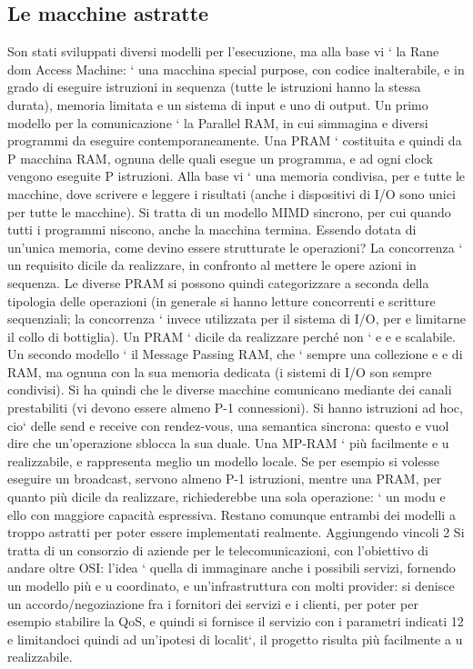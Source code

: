 \documentclass[a4paper,12pt]{article}
\begin{document}
\subsection{Le macchine astratte}
Son stati sviluppati diversi modelli per l'esecuzione, ma alla base vi ` la Rane
dom Access Machine: ` una macchina special purpose, con codice inalterabile,
e
in grado di eseguire istruzioni in sequenza (tutte le istruzioni hanno la stessa
durata), memoria limitata e un sistema di input e uno di output.
Un primo modello per la comunicazione ` la Parallel RAM, in cui simmagina
e
diversi programmi da eseguire contemporaneamente. Una PRAM ` costituita
e
quindi da P macchina RAM, ognuna delle quali esegue un programma, e ad ogni
clock vengono eseguite P istruzioni. Alla base vi ` una memoria condivisa, per
e
tutte le macchine, dove scrivere e leggere i risultati (anche i dispositivi di I/O
sono unici per tutte le macchine). Si tratta di un modello MIMD sincrono, per
cui quando tutti i programmi niscono, anche la macchina termina. Essendo
dotata di un'unica memoria, come devino essere strutturate le operazioni? La
concorrenza ` un requisito dicile da realizzare, in confronto al mettere le opere
azioni in sequenza. Le diverse PRAM si possono quindi categorizzare a seconda
della tipologia delle operazioni (in generale si hanno letture concorrenti e scritture sequenziali; la concorrenza `
invece utilizzata per il sistema di I/O, per
e
limitarne il collo di bottiglia). Un PRAM ` dicile da realizzare perché non `
e
e
e
scalabile.
Un secondo modello ` il Message Passing RAM, che ` sempre una collezione
e
e
di RAM, ma ognuna con la sua memoria dedicata (i sistemi di I/O son sempre
condivisi). Si ha quindi che le diverse macchine comunicano mediante dei canali
prestabiliti (vi devono essere almeno P-1 connessioni). Si hanno istruzioni ad
hoc, cio` delle send e receive con rendez-vous, una semantica sincrona: questo
e
vuol dire che un'operazione sblocca la sua duale. Una MP-RAM ` più facilmente
e u
realizzabile, e rappresenta meglio un modello locale. Se per esempio si volesse
eseguire un broadcast, servono almeno P-1 istruzioni, mentre una PRAM, per
quanto più dicile da realizzare, richiederebbe una sola operazione: ` un modu
e
ello con maggiore capacità espressiva. Restano comunque entrambi dei modelli
a
troppo astratti per poter essere implementati realmente. Aggiungendo vincoli
2 Si tratta di un consorzio di aziende per le telecomunicazioni, con l'obiettivo di andare
oltre OSI: l'idea ` quella di immaginare anche i possibili servizi, fornendo un modello più
e
u
coordinato, e un'infrastruttura con molti provider: si denisce un accordo/negoziazione fra i
fornitori dei servizi e i clienti, per poter per esempio stabilire la QoS, e quindi si fornisce il
servizio con i parametri indicati
12
e limitandoci quindi ad un'ipotesi di localit`, il progetto risulta più facilmente
a
u
realizzabile.
\end{document}
